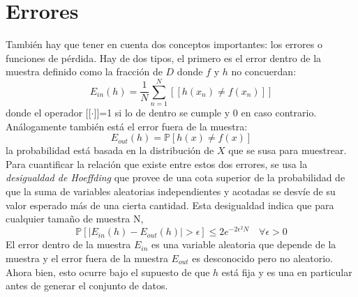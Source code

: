 \section{Errores}
También hay que tener en cuenta dos conceptos importantes: los errores o funciones de pérdida. Hay de dos tipos, el primero es el error dentro de la muestra definido como la fracción de $D$ donde $f$ y $h$ no concuerdan:
\[E_{in}(h) = \frac{1}{N}\sum_{n=1}^{N}[[h(x_{n}) \neq f(x_{n})]]\]
donde el operador [[$\cdot$]]=1 si lo de dentro se cumple y 0 en caso contrario. Análogamente también está el error fuera de la muestra:
\[ E_{out}(h)=\mathbb{P}[h(x) \neq f(x)] \]
la probabilidad está basada en la distribución de $X$ que se susa para muestrear.\\
Para cuantificar la relación que existe entre estos dos errores, se usa la \textit{desigualdad de Hoeffding} que provee de una cota superior de la probabilidad de que la suma de variables aleatorias independientes y acotadas se desvíe de su valor esperado más de una cierta cantidad. Esta desigualdad indica que para cualquier tamaño de muestra N,
\[ \mathbb{P}[\vert E_{in}(h)-E_{out}(h) \vert > \epsilon] \leq  2e^{-2\epsilon^{2}N} \quad \forall \epsilon > 0 \]
El error dentro de la muestra $E_{in}$ es una variable aleatoria que depende de la muestra y el error fuera de la muestra $E_{out}$ es desconocido pero no aleatorio. Ahora bien, esto ocurre bajo el supuesto de que $h$ está fija y es una en particular antes de generar el conjunto de datos. \cite{abu2012learning}
